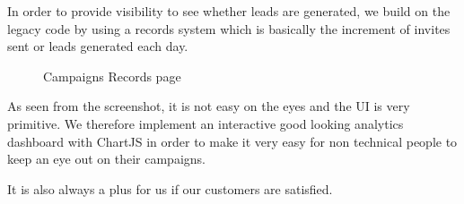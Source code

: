 In order to provide visibility to see whether leads are generated, we build on the legacy code by using a records system which is basically the increment of invites sent or leads generated each day.
\begin{figure}[H]
    \centering
    \caption{Campaigns Records page}
    \label{fig:records-page}
\end{figure}

As seen from the screenshot, it is not easy on the eyes and the UI is very primitive.
We therefore implement an interactive good looking analytics dashboard with ChartJS in order to make it very easy for non technical people to keep an eye out on their campaigns.

It is also always a plus for us if our customers are satisfied.

